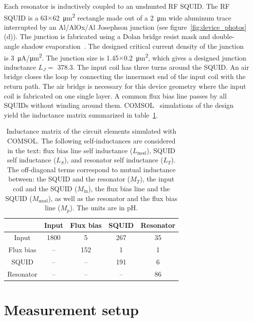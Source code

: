 \documentclass[
 prd,
 reprint,
 superscriptaddress,
 amsmath,amssymb,
 aps,
 floatfix,
]{revtex4-2}
\begin{document}
Each resonator is inductively coupled to an unshunted RF SQUID. The RF SQUID is a 63$\times$\qty{62}{\um^2} rectangle made out of a \qty{2}{\um} wide aluminum trace interrupted by an Al/AlOx/Al Josephson junction (see figure~\ref{fig:device_photos}(d)). The junction is fabricated using a Dolan bridge resist mask and double-angle shadow evaporation~\cite{gingras_improving_2025}. The designed critical current density of the junction is \qty{3}{\uA/\um^2}. The junction size is 1.45$\times$\qty{0.2}{\um^2}, which gives a designed junction inductance $L_J = $ \qty{378.3}{\pH}. The input coil has three turns around the SQUID. An air bridge closes the loop by connecting the innermost end of the input coil with the return path. The air bridge is necessary for this device geometry where the input coil is fabricated on one single layer. A common flux bias line passes by all SQUIDs without winding around them. COMSOL~\cite{comsol_multiphysics} simulations of the design yield the inductance matrix summarized in table~\ref{tab:COMSOL_sim}.

\begin{table}[htb]
    \centering
    \begin{tabular}{c c c c c}
    \hline
          &  \small{Input}& \small{Flux bias} & \small{SQUID} & \small{Resonator} \\
    \hline
    \small{Input} & 1800 & 5 & 267 & 35 \\
    \small{Flux bias} & -- & 152 & 1 & 1 \\
    \small{SQUID} & -- & -- & 191 & 6 \\
    \small{Resonator} & -- & -- & -- & 86 \\
    \hline
    \end{tabular}
    \caption{Inductance matrix of the circuit elements simulated with COMSOL. The following self-inductances are considered in the text: flux bias line self inductance ($L_{\mathrm{mod}}$), SQUID self inductance ($L_S$), and resonator self inductance ($L_T$).  The off-diagonal terms correspond to mutual inductance between: the SQUID and the resonator ($M_T$), the input coil and the SQUID ($M_{\mathrm{in}}$), the flux bias line and the SQUID ($M_{\mathrm{mod}}$), as well as the resonator and the flux bias line ($M_p$). The units are in pH.}
    \label{tab:COMSOL_sim}
\end{table}

\section{Measurement setup}
\label{sec:setup}
\end{document}
